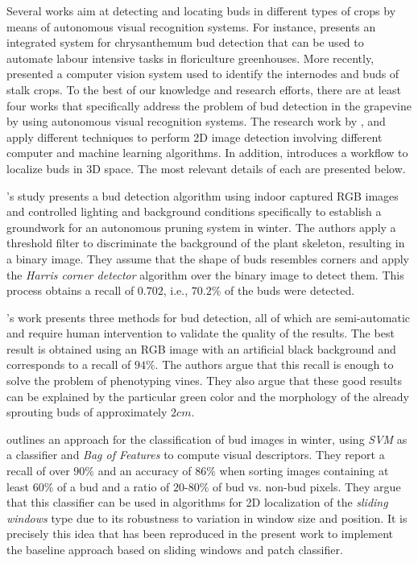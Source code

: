 \documentclass[a4paper,authoryear,review]{elsarticle}
\begin{document}
	Several works aim at detecting and locating buds in different types of crops by means of autonomous visual recognition systems. For instance, \citet{tarry2014integrated} presents an integrated system for chrysanthemum bud detection that can be used to automate labour intensive tasks in floriculture greenhouses. More recently, \citet{zhao2018research} presented a   computer  vision system used to  identify the  internodes and  buds  of  stalk  crops. To the best of our knowledge and research efforts, there are at least four works that specifically address the problem of bud detection in the grapevine by using autonomous visual recognition systems. The research work by \citet{xu2014detection}, \citet{herzog2014initial} and \citet{perez2017image} apply different techniques to perform 2D image detection involving different computer and machine learning algorithms. In addition, \citet{diaz2018grapevine} introduces a workflow to localize buds in 3D space. The most relevant details of each are presented below.
	
	\citet{xu2014detection}’s study presents a bud detection algorithm using indoor captured RGB images and controlled lighting and background conditions specifically to establish a groundwork for an autonomous pruning system in winter. The authors apply a threshold filter to discriminate the background of the plant skeleton, resulting in a binary image. They assume that the shape of buds resembles corners and apply the \emph{Harris corner detector} algorithm over the binary image to detect them. This process obtains a recall of $0.702$, i.e., $70.2\%$ of the buds were detected. 
	
	\citet{herzog2014initial}’s work presents three methods for bud detection, all of which are semi-automatic and require human intervention to validate the quality of the results. The best result is obtained using an RGB image with an artificial black background and corresponds to a recall of $94\%$. The authors argue that this recall is enough to solve the problem of phenotyping vines. They also argue that these good results can be explained by the particular green color and the morphology of the already sprouting buds of approximately $2cm$.  
	
	\citet{perez2017image} outlines an approach for the classification of bud images in winter, using \emph{SVM} as a classifier and \emph{Bag of Features} to compute visual descriptors. They report a recall of over $90\%$ and an accuracy of $86\%$ when sorting images containing at least $60\%$ of a bud and a ratio of $20$-$80\%$ of bud vs. non-bud pixels. They argue that this classifier can be used in algorithms for 2D localization of the \emph{sliding windows} type due to its robustness to variation in window size and position. It is precisely this idea that has been reproduced in the present work to implement the baseline approach based on sliding windows and patch classifier.
	
\end{document}
